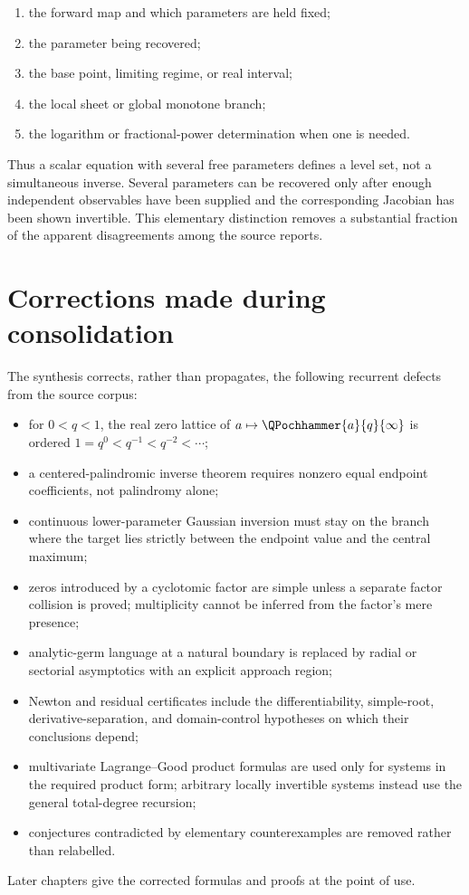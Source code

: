 \begin{enumerate}
\item the forward map and which parameters are held fixed;
\item the parameter being recovered;
\item the base point, limiting regime, or real interval;
\item the local sheet or global monotone branch;
\item the logarithm or fractional-power determination when one is needed.
\end{enumerate}

Thus a scalar equation with several free parameters defines a level set, not a
simultaneous inverse.  Several parameters can be recovered only after enough
independent observables have been supplied and the corresponding Jacobian has
been shown invertible.  This elementary distinction removes a substantial
fraction of the apparent disagreements among the source reports.

\section{Corrections made during consolidation}
\label{sec:corrections}

The synthesis corrects, rather than propagates, the following recurrent
defects from the source corpus:

\begin{itemize}
\item for \(0<q<1\), the real zero lattice of
  \(a\mapsto\QPochhammer{a}{q}{\infty}\) is ordered
  \(1=q^0<q^{-1}<q^{-2}<\cdots\);
\item a centered-palindromic inverse theorem requires nonzero equal endpoint
  coefficients, not palindromy alone;
\item continuous lower-parameter Gaussian inversion must stay on the branch
  where the target lies strictly between the endpoint value and the central
  maximum;
\item zeros introduced by a cyclotomic factor are simple unless a separate
  factor collision is proved; multiplicity cannot be inferred from the
  factor's mere presence;
\item analytic-germ language at a natural boundary is replaced by radial or
  sectorial asymptotics with an explicit approach region;
\item Newton and residual certificates include the differentiability,
  simple-root, derivative-separation, and domain-control hypotheses on which
  their conclusions depend;
\item multivariate Lagrange--Good product formulas are used only for systems
  in the required product form; arbitrary locally invertible systems instead
  use the general total-degree recursion;
\item conjectures contradicted by elementary counterexamples are removed
  rather than relabelled.
\end{itemize}

Later chapters give the corrected formulas and proofs at the point of use.
